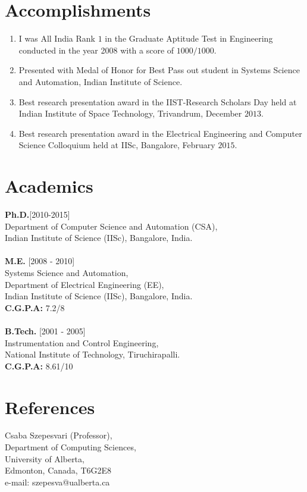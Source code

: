 \documentclass[line,margin]{res}
\begin{document}
\begin{resume}
\section{Accomplishments}
\begin{enumerate}
\item I was All India Rank $1$ in the Graduate Aptitude Test in Engineering conducted in the year 2008 with a score of $1000/1000$.
\item Presented with Medal of Honor for Best Pass out student in Systems Science and Automation, Indian Institute of Science.
\item Best research presentation award in the IIST-Research Scholars Day held at Indian Institute of Space Technology, Trivandrum, December $2013$.
\item Best research presentation award in the Electrical Engineering and Computer Science Colloquium held at IISc, Bangalore, February $2015$.
\end{enumerate}


\section{Academics}
  \textbf{Ph.D.}[2010-2015] \\
  Department of Computer Science and Automation (CSA), \\
  Indian Institute of Science (IISc), Bangalore, India. \\
  \\
  \textbf{M.E.} [2008 - 2010] \\
  Systems Science and Automation,\\
  Department of Electrical Engineering (EE), \\
  Indian Institute of Science (IISc), Bangalore, India. \\
  \textbf{C.G.P.A:} 7.2/8 \\
  \\
  \textbf{B.Tech.} [2001 - 2005]\\
  Instrumentation and Control Engineering, \\
  National Institute of Technology, Tiruchirapalli.\\
  \textbf{C.G.P.A:} 8.61/10  \\
\section{References}
Csaba Szepesvari (Professor),\\
Department of Computing Sciences,\\
University of Alberta,\\
Edmonton, Canada, T6G2E8\\
e-mail: szepesva@ualberta.ca\\


\end{resume}
\end{document}
